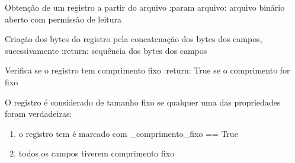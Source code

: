 \documentclass[letterpaper,10pt,brazil]{sphinxmanual}
\begin{document}
\begin{fulllineitems}
\begin{fulllineitems}
\label{\detokenize{estrutarq.registro:estrutarq.registro.registro_comum.RegistroBasico.leia}}
\pysigstartsignatures
{}
\pysigstopsignatures
\sphinxAtStartPar
Obtenção de um registro a partir do arquivo
:param arquivo: arquivo binário aberto com permissão de leitura

\end{fulllineitems}


\begin{fulllineitems}
\label{\detokenize{estrutarq.registro:estrutarq.registro.registro_comum.RegistroBasico.para_bytes}}
\pysigstartsignatures
{}
\pysigstopsignatures
\sphinxAtStartPar
Criação dos bytes do registro pela concatenação dos bytes dos campos,
sucessivamente
:return: sequência dos bytes dos campos

\end{fulllineitems}


\begin{fulllineitems}
\label{\detokenize{estrutarq.registro:estrutarq.registro.registro_comum.RegistroBasico.tem_comprimento_fixo}}
\pysigstartsignatures
{}
\pysigstopsignatures
\sphinxAtStartPar
Verifica se o registro tem comprimento fixo
:return: True se o comprimento for fixo

\sphinxAtStartPar
O registro é considerado de tamanho fixo se qualquer uma das
propriedades foram verdadeiras:
\begin{enumerate}
%
\item {} 
\sphinxAtStartPar
o registro tem é marcado com \_comprimento\_fixo == True

\item {} 
\sphinxAtStartPar
todos os campos tiverem comprimento fixo


\end{enumerate}
\end{fulllineitems}
\end{fulllineitems}
\end{document}
